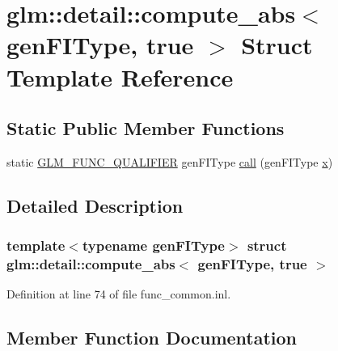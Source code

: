 \hypertarget{structglm_1_1detail_1_1compute__abs_3_01gen_f_i_type_00_01true_01_4}{}\section{glm\+::detail\+::compute\+\_\+abs$<$ gen\+F\+I\+Type, true $>$ Struct Template Reference}
\label{structglm_1_1detail_1_1compute__abs_3_01gen_f_i_type_00_01true_01_4}
\subsection*{Static Public Member Functions}
\begin{DoxyCompactItemize}
\item 
static \mbox{\hyperlink{setup_8hpp_a33fdea6f91c5f834105f7415e2a64407}{G\+L\+M\+\_\+\+F\+U\+N\+C\+\_\+\+Q\+U\+A\+L\+I\+F\+I\+ER}} gen\+F\+I\+Type \mbox{\hyperlink{structglm_1_1detail_1_1compute__abs_3_01gen_f_i_type_00_01true_01_4_aa71d12c5d1f14e48f3be96bdf6b95861}{call}} (gen\+F\+I\+Type \mbox{\hyperlink{glad_8h_a92d0386e5c19fb81ea88c9f99644ab1d}{x}})
\end{DoxyCompactItemize}


\subsection{Detailed Description}
\subsubsection*{template$<$typename gen\+F\+I\+Type$>$\newline
struct glm\+::detail\+::compute\+\_\+abs$<$ gen\+F\+I\+Type, true $>$}



Definition at line 74 of file func\+\_\+common.\+inl.



\subsection{Member Function Documentation}
\mbox{\label{structglm_1_1detail_1_1compute__abs_3_01gen_f_i_type_00_01true_01_4_aa71d12c5d1f14e48f3be96bdf6b95861}} 
